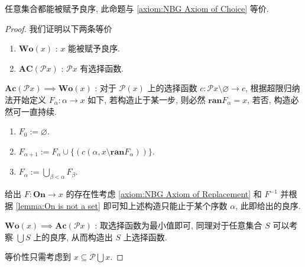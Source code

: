 \begin{theorem}
      \label{theorem:well-ordering theorem} 
    任意集合都能被赋予良序, 此命题与 \ref{axiom:NBG Axiom of Choice} 等价.

    \begin{proof}
        我们证明以下两条等价
        \begin{enumerate}
            \item \(\mathbf{Wo} (x)\) : \(x\) 能被赋予良序.
            \item \(\mathbf{AC} (\mathcal{P} x)\) : \(\mathcal{P} x\) 有选择函数.
        \end{enumerate}

        \(\mathbf{Ac} (\mathcal{P}x) \implies \mathbf{Wo} (x)\) : 对于 \(\mathcal{P} (x)\) 上的选择函数 \(c : \mathcal{P}x \setminus {\varnothing} \to c\),
        根据超限归纳法开始定义 \(F_\alpha : \alpha \to x\) 如下, 若构造止于某一步, 则必然 \(\mathbf{ran} F_\alpha = x\), 若否, 构造必然可一直持续.

        \begin{enumerate}
            \item \(F_0 := \varnothing\).
            \item \(F_{\alpha + 1} := F_\alpha \cup \{(c (\alpha,x \setminus \mathbf{ran} F_\alpha))\}\).
            \item \(F_\alpha := \bigcup_{\beta < \alpha} F_\beta\).
        \end{enumerate}

        给出 \(F : \mathbf{On} \to x\) 的存在性考虑 \ref{axiom:NBG Axiom of Replacement} 和 \(F^{-1}\) 并根据 \ref{lemma:On is not a set} 即可知上述构造只能止于某个序数 \(\alpha\), 此即给出的良序.

        \(\mathbf{Wo} (x) \implies \mathbf{Ac} (\mathcal{P}x)\) : 取选择函数为最小值即可, 同理对于任意集合 \(S\) 可以考察 \(\bigcup S\) 上的良序, 从而构造出 \(S\) 上选择函数.

        等价性只需考虑到 \(x \subseteq \mathcal{P} \bigcup x\).
    \end{proof}
\end{theorem}

